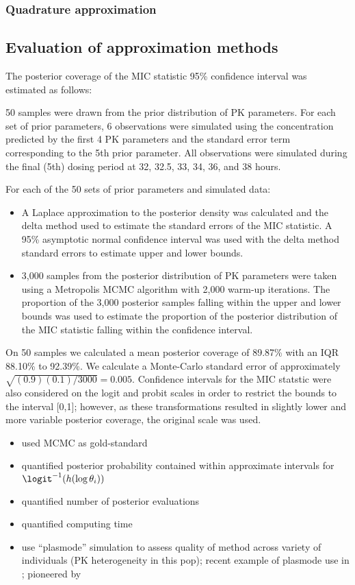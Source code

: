 \documentclass{article}
\begin{document}
\subsubsection{Quadrature approximation}
\subsection{Evaluation of approximation methods}


The posterior coverage of the MIC statistic 95\% confidence interval was estimated as follows:
 
50 samples were drawn from the prior distribution of PK parameters. For each set of prior parameters, 6 observations were simulated using the concentration predicted by the first 4 PK parameters and the standard error term corresponding to the 5th prior parameter. All observations were simulated during the final (5th) dosing period at 32, 32.5, 33, 34, 36, and 38 hours. 

For each of the 50 sets of prior parameters and simulated data:
 
\begin{itemize}
	 \item A Laplace approximation to the posterior density was calculated and the delta method used to estimate the standard errors of the MIC statistic. A 95\% asymptotic normal confidence interval was used with the delta method standard errors to estimate upper and lower bounds.
	 \item 3,000 samples from the posterior distribution of PK parameters were taken using a Metropolis MCMC algorithm with 2,000 warm-up iterations. The proportion of the 3,000 posterior samples falling within the upper and lower bounds was used to estimate the proportion of the posterior distribution of the MIC statistic falling within the confidence interval. 
\end{itemize}
		
On 50 samples we calculated a mean posterior coverage of 89.87\% with an IQR 88.10\% to 92.39\%. We calculate a Monte-Carlo standard error of approximately $\sqrt{(0.9)(0.1)/3000} = 0.005$. Confidence intervals for the MIC statstic were also considered on the logit and probit scales in order to restrict the bounds to the interval [0,1]; however, as these transformations resulted in slightly lower and more variable posterior coverage, the original scale was used. 
		

\begin{itemize}
\item used MCMC as gold-standard
\item quantified posterior probability contained within approximate intervals for $\logit^{-1}(h(\log \theta_i))$
\item quantified number of posterior evaluations
\item quantified computing time
\item use ``plasmode'' simulation to assess quality of method across variety of individuals (PK heterogeneity in this pop); recent example of plasmode use in \cite{Franklin2014}; pioneered by \cite{Vaughan2009}
\end{itemize}
\end{document}
